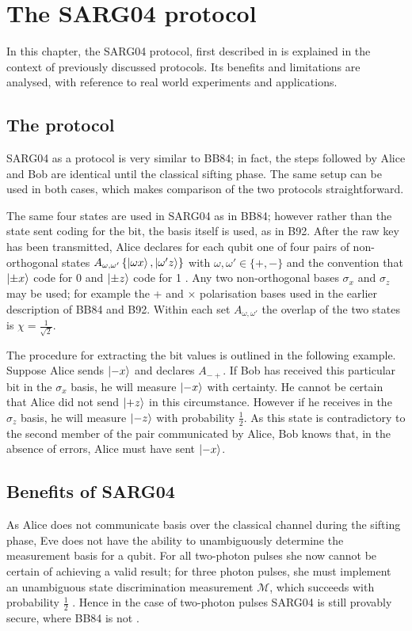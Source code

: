 \documentclass[paper=a4, fontsize=11pt]{scrartcl} %
\numberwithin{equation}{section} %
\numberwithin{figure}{section} %
\numberwithin{table}{section} %
\begin{document}

\clearpage
\section{The SARG04 protocol}
In this chapter, the SARG04 protocol, first described in \citet{SARG04orig} is explained in the context of previously discussed protocols.
Its benefits and limitations are analysed, with reference to real world experiments and applications.

\subsection{The protocol}
SARG04 as a protocol is very similar to BB84; in fact, the steps followed by Alice and Bob are identical until the classical sifting phase.
The same setup can be used in both cases, which makes comparison of the two protocols straightforward.

The same four states are used in SARG04 as in BB84; however rather than the state sent coding for the bit, the basis itself is used, as in B92.
After the raw key has been transmitted, Alice declares for each qubit one of four pairs of
non-orthogonal states $A_{\omega, \omega'} \left\{ \ket{\omega x}, \ket{\omega' z}\right\}$ with $\omega, \omega' \in \{ +, -\}$
and the convention that $\ket{\pm x}$ code for 0 and $\ket{\pm z}$ code for 1 \citep{SARG04orig}. Any two non-orthogonal bases $\sigma_x$
and $\sigma_z$ may be used; for example the + and $\times$ polarisation bases used in the earlier description of BB84 and B92. Within each set $A_{\omega, \omega'}$
the overlap of the two states is $\chi = \frac{1}{\sqrt{2}}$.

The procedure for extracting the bit values is outlined in the following example. Suppose Alice sends $\ket{-x}$ and declares $A_{- +}$.
If Bob has received this particular bit in the $\sigma_x$ basis, he will measure $\ket{-x}$ with certainty. He cannot be certain that Alice did
not send $\ket{+z}$ in this circumstance. However if he receives in the $\sigma_z$ basis, he will measure $\ket{-z}$ with probability $\frac{1}{2}$.
As this state is contradictory to the second member of the pair communicated by Alice, Bob knows that, in the absence of errors, Alice must have sent $\ket{-x}$.

\subsection{Benefits of SARG04}
As Alice does not communicate basis over the classical channel during the sifting phase, Eve does not have the ability to
unambiguously determine the measurement basis for a qubit. For all two-photon pulses she now cannot be certain of achieving
a valid result; for three photon pulses, she must implement an unambiguous state discrimination measurement $\mathcal{M}$, which succeeds with probability
$\frac{1}{2}$ \citep{branciardSARG04}. Hence in the case of two-photon pulses SARG04 is still provably secure, where BB84 is not \citep{perf2protocols}.
\end{document}
